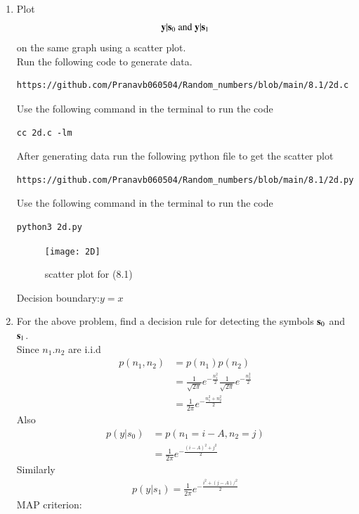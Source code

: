 \documentclass[journal,12pt,twocolumn]{IEEEtran}
\renewcommand\thesection{\arabic{section}}
\begin{document}
\begin{enumerate}[label=\thesection.\arabic*
,ref=\thesection.\theenumi]

\item
\label{ch5_fsk}
Plot 
%
\begin{equation}
\mathbf{y}|\mathbf{s}_0 \text{ and } \mathbf{y}|\mathbf{s}_1
\end{equation}
%
on the same graph using a scatter plot.\\
\solution
Run the following code to generate data.
\begin{lstlisting}
https://github.com/Pranavb060504/Random_numbers/blob/main/8.1/2d.c
\end{lstlisting}
Use the following command in the terminal to run the code
\begin{lstlisting}
cc 2d.c -lm
\end{lstlisting}
After generating data run the following python file to get the scatter plot
\begin{lstlisting}
https://github.com/Pranavb060504/Random_numbers/blob/main/8.1/2d.py
\end{lstlisting}
Use the following command in the terminal to run the code
\begin{lstlisting}
python3 2d.py
\end{lstlisting}
\begin{figure}[h]
\texttt{[image: 2D]}
\caption{scatter plot for (8.1)}
\label{fig:S2d}
\end{figure}
Decision boundary:$y=x$
%
\item
For the above problem, find a decision rule for detecting the symbols $\mathbf{s}_0 $ and $\mathbf{s}_1$.\\
\solution
Since $n_1. n_2$ are i.i.d 
\begin{align}
    p(n_1,n_2) &= p(n_1)p(n_2)\\
&= \frac{1}{\sqrt{2\pi}} e^{-\frac{n_1^2}{2}} \frac{1}{\sqrt{2\pi}} e^{-\frac{n_2^2}{2}}\\
&= \frac{1}{2\pi}e^{-\frac{n_1^2+n_2^2}{2}}
\end{align}
Also 
\begin{align}
    p(y|s_0) &= p(n_1 = i-A, n_2 = j)\\
    &= \frac{1}{2\pi}e^{-\frac{{(i-A)}^2+j^2}{2}}
\end{align}
Similarly 
\begin{align}
    p(y|s_1) = \frac{1}{2\pi}e^{-\frac{i^2+{(j-A)}/^2}{2}}
\end{align}
MAP criterion:
\begin{align}

\end{align}
\end{enumerate}
\end{document}
